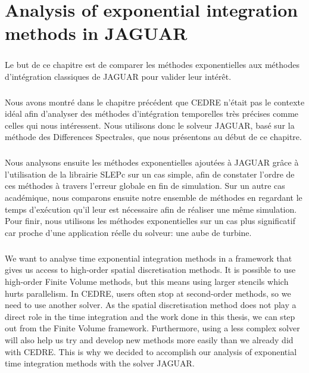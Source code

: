 \chapter{Analysis of exponential integration methods in JAGUAR}

\begin{tcolorbox}[title=Résumé du chapitre : Analyse des méthodes d'intégration exponentielles dans JAGUAR, colframe=black!50!white]
  \paragraph{}
  Le but de ce chapitre est de comparer les méthodes exponentielles aux méthodes d'intégration classiques de JAGUAR pour valider leur intérêt.

  \paragraph{}
  Nous avons montré dans le chapitre précédent que CEDRE n'était pas le contexte idéal afin d'analyser des méthodes d'intégration temporelles très précises comme celles qui nous intéressent.
  Nous utilisons donc le solveur JAGUAR, basé sur la méthode des Differences Spectrales, que nous présentons au début de ce chapitre.

  \paragraph{}
  Nous analysons ensuite les méthodes exponentielles ajoutées à JAGUAR grâce à l'utilisation de la librairie SLEPc sur un cas simple, afin de constater l'ordre de ces méthodes à travers l'erreur globale en fin de simulation.
  Sur un autre cas académique, nous comparons ensuite notre ensemble de méthodes en regardant le temps d'exécution qu'il leur est nécessaire afin de réaliser une même simulation.
  Pour finir, nous utilisons les méthodes exponentielles sur un cas plus significatif car proche d'une application réelle du solveur: une aube de turbine.
\end{tcolorbox}

  \paragraph{}
  We want to analyse time exponential integration methods in a framework that gives us access to high-order spatial discretisation methods.
  It is possible to use high-order Finite Volume methods, but this means using larger stencils which hurts parallelism.
  In CEDRE, users often stop at second-order methods, so we need to use another solver.
  As the spatial discretisation method does not play a direct role in the time integration and the work done in this thesis, we can step out from the Finite Volume framework.
  Furthermore, using a less complex solver will also help us try and develop new methods more easily than we already did with CEDRE.
  This is why we decided to accomplish our analysis of exponential time integration methods with the solver JAGUAR.


